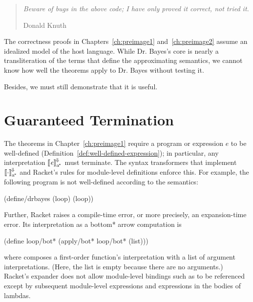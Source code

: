 \begin{quote}
\textit{Beware of bugs in the above code; I have only proved it correct, not tried it.}

\hfill Donald Knuth
\end{quote}

The correctness proofs in Chapters~\ref{ch:preimage1} and~\ref{ch:preimage2} assume an idealized model of the host language.
While Dr. Bayes's core is nearly a transliteration of the \lzfclang terms that define the approximating semantics, we cannot know how well the theorems apply to Dr. Bayes without testing it.

Besides, we must still demonstrate that it is useful.

\section{Guaranteed Termination}

The theorems in Chapter~\ref{ch:preimage1} require a program or expression $\mathit{e}$ to be well-defined (Definition~\ref{def:well-defined-expression}); in particular, any interpretation $\left\llbracket{\mathit{e}}\right\rrbracket^{\mspace{-2mu}\Downarrow\mspace{-2mu}}_\mathrm{a^{\mspace{-2mu}*}}$ must terminate.
The syntax transformers that implement $\left\llbracket{\cdot}\right\rrbracket^{\mspace{-2mu}\Downarrow\mspace{-2mu}}_\mathrm{a^{\mspace{-2mu}*}}$ and Racket's rules for module-level definitions enforce this.
For example, the following program is not well-defined according to the semantics:
\begin{center}\singlespacing
\begin{schemedisplay}
(define/drbayes (loop) (loop))
\end{schemedisplay}
\end{center}
Further, Racket raises a compile-time error, or more precisely, an expansion-time error.
Its interpretation as a bottom* arrow computation is
\begin{center}\singlespacing
\begin{schemedisplay}
(define loop/bot* (apply/bot* loop/bot* (list)))
\end{schemedisplay}
\end{center}
where  composes a first-order function's interpretation with a list of argument interpretations.
(Here, the list is empty because there are no arguments.)
Racket's expander does not allow module-level bindings such as  to be referenced except by subsequent module-level expressions and expressions in the bodies of lambdas.


